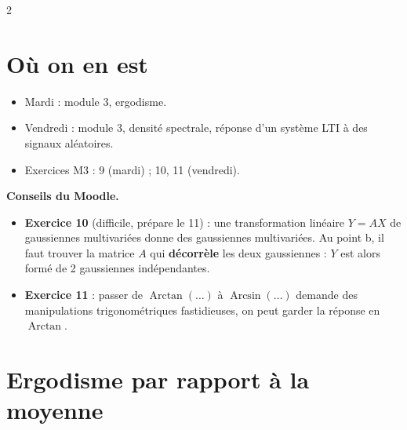 \documentclass[a4paper,9pt]{extarticle}
\begin{document}

\thispagestyle{fancy}



\begin{multicols}{2}


\section{Où on en est}


\begin{summary}

\begin{itemize}

\item Mardi : module 3, ergodisme.

\item Vendredi : module 3, densité spectrale, réponse d'un système LTI à des signaux
aléatoires.

\item Exercices M3 : 9 (mardi) ; 10, 11 (vendredi).

\end{itemize}

\end{summary}


\begin{important}

\textbf{Conseils du Moodle.}

\begin{itemize}

\item \textbf{Exercice 10} (difficile, prépare le 11) : une transformation linéaire $Y = AX$ de
gaussiennes multivariées donne des gaussiennes multivariées. Au point b, il faut trouver la
matrice $A$ qui \textbf{décorrèle} les deux gaussiennes : $Y$ est alors formé de 2 gaussiennes
indépendantes.

\item \textbf{Exercice 11} : passer de $\operatorname{Arctan}(\dots)$ à
$\operatorname{Arcsin}(\dots)$ demande des manipulations trigonométriques fastidieuses, on peut
garder la réponse en $\operatorname{Arctan}$.

\end{itemize}

\end{important}


\section{Ergodisme par rapport à la moyenne}



\end{multicols}
\end{document}
